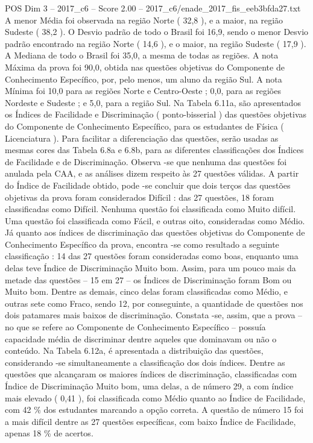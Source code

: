 \begin{textsample}{POS Dim 3 – 2017\_c6 – Score 2.00 – 2017\_c6/enade\_2017\_fis\_eeb3bfda27.txt}
A menor Média foi observada na região Norte ( 32,8 ), e a maior, na região Sudeste ( 38,2 ).
O Desvio padrão de todo o Brasil foi 16,9, sendo o menor Desvio padrão encontrado na região Norte ( 14,6 ), e o maior, na região Sudeste ( 17,9 ).
A Mediana de todo o Brasil foi 35,0, a mesma de todas as regiões.
A nota Máxima da prova foi 90,0, obtida nas questões objetivas do Componente de Conhecimento Específico, por, pelo menos, um aluno da região Sul.
A nota Mínima foi 10,0 para as regiões Norte e Centro-Oeste ; 0,0, para as regiões Nordeste e Sudeste ; e 5,0, para a região Sul.
Na Tabela 6.11a, são apresentados os Índices de Facilidade e Discriminação ( ponto-bisserial ) das questões objetivas do Componente de Conhecimento Específico, para os estudantes de Física ( Licenciatura ).
Para facilitar a diferenciação das questões, serão usadas as mesmas cores das Tabela 6.8a e 6.8b, para as diferentes classificações dos Índices de Facilidade e de Discriminação.
Observa -se que nenhuma das questões foi anulada pela CAA, e as análises dizem respeito às 27 questões válidas.
A partir do Índice de Facilidade obtido, pode -se concluir que dois terços das questões objetivas da prova foram considerados Difícil : das 27 questões, 18 foram classificadas como Difícil.
Nenhuma questão foi classificada como Muito difícil.
Uma questão foi classificada como Fácil, e outras oito, consideradas como Médio.
Já quanto aos índices de discriminação das questões objetivas do Componente de Conhecimento Específico da prova, encontra -se como resultado a seguinte classificação : 14 das 27 questões foram consideradas como boas, enquanto uma delas teve Índice de Discriminação Muito bom.
Assim, para um pouco mais da metade das questões – 15 em 27 – os Índices de Discriminação foram Bom ou Muito bom.
Dentre as demais, cinco delas foram classificadas como Médio, e outras sete como Fraco, sendo 12, por conseguinte, a quantidade de questões nos dois patamares mais baixos de discriminação.
Constata -se, assim, que a prova – no que se refere ao Componente de Conhecimento Específico – possuía capacidade média de discriminar dentre aqueles que dominavam ou não o conteúdo.
Na Tabela 6.12a, é apresentada a distribuição das questões, considerando -se simultaneamente a classificação dos dois índices.
Dentre as questões que alcançaram os maiores índices de discriminação, classificadas com Índice de Discriminação Muito bom, uma delas, a de número 29, a com índice mais elevado ( 0,41 ), foi classificada como Médio quanto ao Índice de Facilidade, com 42 \% dos estudantes marcando a opção correta.
A questão de número 15 foi a mais difícil dentre as 27 questões específicas, com baixo Índice de Facilidade, apenas 18 \% de acertos.

\end{textsample}
